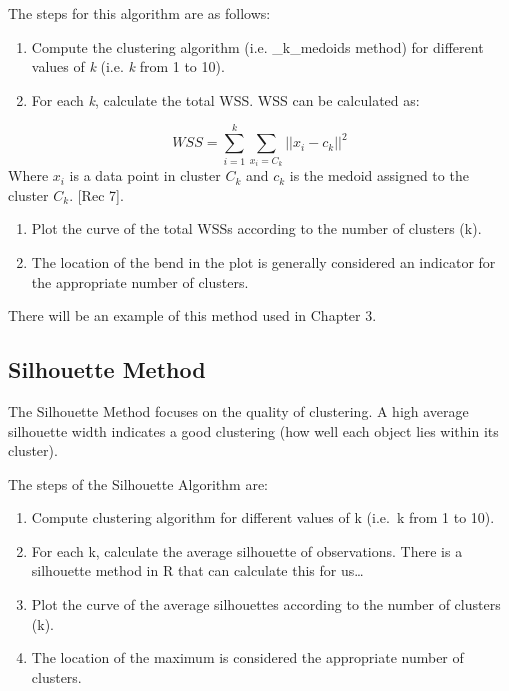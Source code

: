 \documentclass[12pt,twoside]{amherstthesis}
\providecommand{\tightlist}{%
  \setlength{\itemsep}{0pt}\setlength{\parskip}{0pt}}
\begin{document}
  The steps for this algorithm are as follows:
  
  \begin{enumerate}
  \def\labelenumi{\arabic{enumi}.}
  \tightlist
  \item
    Compute the clustering algorithm (i.e. \_k\_medoids method) for
    different values of \emph{k} (i.e. \emph{k} from 1 to 10).
  \item
    For each \emph{k}, calculate the total WSS. WSS can be calculated as:
  \end{enumerate}
  
  \[WSS= \sum_{i=1}^k \sum_{x_i = C_k} ||{{x_i- c_k}}||^2\] Where \(x_i\)
  is a data point in cluster \(C_k\) and \(c_k\) is the medoid assigned to
  the cluster \(C_k\). {[}Rec 7{]}.
  
  \begin{enumerate}
  \def\labelenumi{\arabic{enumi}.}
  \setcounter{enumi}{2}
  \tightlist
  \item
    Plot the curve of the total WSSs according to the number of clusters
    (k).
  \item
    The location of the bend in the plot is generally considered an
    indicator for the appropriate number of clusters.
  \end{enumerate}
  
  There will be an example of this method used in Chapter 3.
  
  \subsection{Silhouette Method}\label{silhouette-method}
  
  The Silhouette Method focuses on the quality of clustering. A high
  average silhouette width indicates a good clustering (how well each
  object lies within its cluster).
  
  The steps of the Silhouette Algorithm are:
  
  \begin{enumerate}
  \def\labelenumi{\arabic{enumi}.}
  \tightlist
  \item
    Compute clustering algorithm for different values of k (i.e.~k from 1
    to 10).
  \item
    For each k, calculate the average silhouette of observations. There is
    a silhouette method in R that can calculate this for us\ldots{}
  \item
    Plot the curve of the average silhouettes according to the number of
    clusters (k).
  \item
    The location of the maximum is considered the appropriate number of
    clusters.
  \end{enumerate}
  
\end{document}
